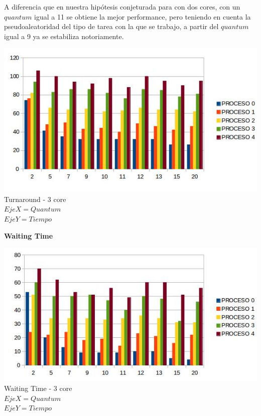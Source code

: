  \indent A diferencia que en nuestra hipótesis conjeturada para con dos cores, con un $quantum$ igual a 11 se obtiene la mejor
 performance, pero teniendo en cuenta la pseudoaleatoridad del tipo de tarea con la que se trabajo, a partir del $quantum$ igual
 a 9 ya se estabiliza notoriamente.\\
   
    \begin{center}
    	\includegraphics[width=1\textwidth]{./EJ7/tour3core.png}
	{Turnaround - 3 core}\\
	{$Eje X = Quantum $\\$ Eje Y = Tiempo$}\\
 \end{center} 
  
   \begin{center}
  \textbf{Waiting Time}
 \end{center}

  \begin{center}
    	\includegraphics[width=1\textwidth]{./EJ7/waintin3core.jpg}
	{Waiting Time - 3 core}	\\
	{$Eje X = Quantum $\\$Eje Y = Tiempo$}\\
 \end{center} 
 

